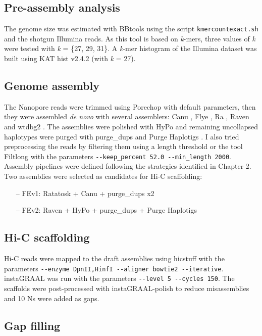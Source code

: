 \subsection{Pre-assembly analysis}

The genome size was estimated with BBtools \cite{bbtools} using the script \texttt{kmercountexact.sh} and the shotgun Illumina reads. As this tool is based on \textit{k}-mers, three values of \textit{k} were tested with \textit{k} = \{27, 29, 31\}. A \textit{k}-mer histogram of the Illumina dataset was built using KAT hist v2.4.2 (with \textit{k} = 27). 

\subsection{Genome assembly}

The Nanopore reads were trimmed using Porechop \cite{porechop} with default parameters, then they were assembled \textit{de novo} with several assemblers: Canu \cite{canu}, Flye \cite{flye}, Ra \cite{ra}, Raven \cite{raven} and wtdbg2 \cite{wtdbg2}. The assemblies were polished with HyPo \cite{hypo} and remaining uncollapsed haplotypes were purged with purge\_dups \cite{purge_dups} and Purge Haplotigs \cite{purge_haplotigs}. I also tried preprocessing the reads by filtering them using a length threshold or the tool Filtlong with the parameters \texttt{-{}-keep\_percent 52.0 -{}-min\_length 2000}. Assembly pipelines were defined following the strategies identified in Chapter 2. Two assemblies were selected as candidates for Hi-C scaffolding:
\begin{itemize}
    \item[--] FEv1: Ratatosk + Canu + purge\_dups x2
    \item[--] FEv2: Raven + HyPo + purge\_dups + Purge Haplotigs
\end{itemize}

\subsection{Hi-C scaffolding}

Hi-C reads were mapped to the draft assemblies using hicstuff \cite{hicstuff} with the parameters \texttt{-{}-enzyme DpnII,HinfI -{}-aligner bowtie2 -{}-iterative}. instaGRAAL was run with the parameters \texttt{-{}-level 5 -{}-cycles 150}. The scaffolds were post-processed with instaGRAAL-polish to reduce misassemblies and 10 Ns were added as gaps.

\subsection{Gap filling}

